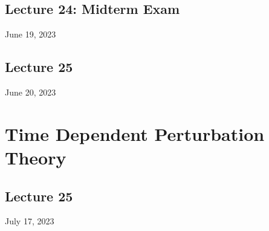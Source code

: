 \documentclass[12pt,fancychapters]{report}
\numberwithin{equation}{section}
\begin{document}
\section{Lecture 24: Midterm Exam}
June 19, 2023




\newpage
\section{Lecture 25}
June 20, 2023





\newpage
\chapter{Time Dependent Perturbation Theory}
\section{Lecture 25}
July 17, 2023
\end{document}
